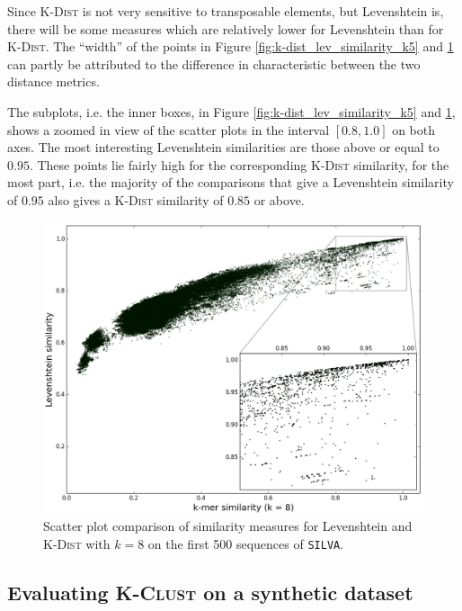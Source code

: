 Since \textsc{K-Dist} is not very sensitive to transposable elements, but
Levenshtein is, there will be some measures which are relatively lower for
Levenshtein than for \textsc{K-Dist}. The ``width'' of the points in Figure
\ref{fig:k-dist_lev_similarity_k5} and \ref{fig:k-dist_lev_similarity_k8} can
partly be attributed to the difference in characteristic between the two
distance metrics.

The subplots, i.e. the inner boxes, in Figure
\ref{fig:k-dist_lev_similarity_k5} and \ref{fig:k-dist_lev_similarity_k8},
shows a zoomed in view of the scatter plots in the interval $[0.8,1.0]$ on both
axes. The most interesting Levenshtein similarities are those above or equal to
$0.95$. These points lie fairly high for the corresponding \textsc{K-Dist}
similarity, for the most part, i.e. the majority of the comparisons that give a
Levenshtein similarity of $0.95$ also gives a \textsc{K-Dist} similarity of
$0.85$ or above.

\begin{figure}[H]
  \includegraphics[width=1.0\textwidth]{graphics/Levenshtein_K-Dist_k8.png}
  \caption{Scatter plot comparison of similarity measures for Levenshtein and
    \textsc{K-Dist} with $k=8$ on the first 500 sequences of \texttt{SILVA}.}
  \label{fig:k-dist_lev_similarity_k8}
\end{figure}


\subsection{Evaluating \textsc{K-Clust} on a synthetic dataset}
\label{sec:synth_dataset}

